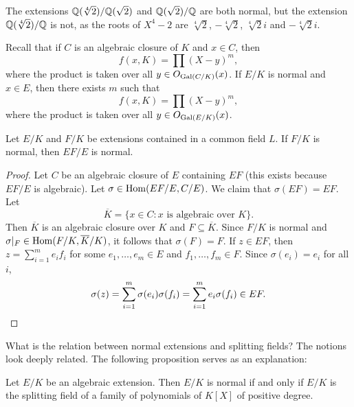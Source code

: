 \begin{example}
The extensions $\mathbb{Q}(\sqrt[4]{2})/\mathbb{Q}(\sqrt{2})$ and $\mathbb{Q}(\sqrt{2})/\mathbb{Q}$ are both
normal, but the extension $\mathbb{Q}(\sqrt[4]{2})/\mathbb{Q}$ is not, 
as the roots of $X^4-2$ are
$\sqrt[4]{2}$, $-\sqrt[4]{2}$, $\sqrt[4]{2}i$ and $-\sqrt[4]{2}i$.
\end{example}


Recall that if $C$ is an algebraic closure of $K$ and $x\in C$,
then 
\[
f(x,K)=\prod(X-y)^m,
\]
where the product is taken over all 
$y\in O_{\operatorname{Gal}(C/K)}(x)$. 
If $E/K$ is normal and $x\in E$, then there exists $m$ such that 
\[
f(x,K)=\prod(X-y)^m,
\]
where the product is taken over all 
$y\in O_{\operatorname{Gal}(E/K)}(x)$. 

\begin{proposition}
    Let $E/K$ and $F/K$ be extensions contained in a common field $L$. If $F/K$ 
    is normal, then $EF/E$ is normal.
\end{proposition}

\begin{proof}
    Let $C$ be an algebraic closure of $E$ containing $EF$ (this exists because $EF/E$ is algebraic). 
    Let $\sigma\in\operatorname{Hom}(EF/E,C/E)$. We claim that $\sigma(EF)=EF$. Let 
    \[
    \overline{K}=\{x\in C:x\text{ is algebraic over $K$}\}.
    \]
    Then $\overline{K}$ is an algebraic closure over $K$ and $F\subseteq\overline{K}$. 
    Since $F/K$ is normal and $\sigma|_F\in\operatorname{Hom}(F/K,\overline{K}/K)$, 
    it follows that $\sigma(F)=F$. If $z\in EF$, then
    $z=\sum_{i=1}^m e_if_i$ for some $e_1,\dots,e_m\in E$ and 
    $f_1,\dots,f_m\in F$. Since $\sigma(e_i)=e_i$ for all $i$,  
    \[
    \sigma(z)=\sum_{i=1}^m\sigma(e_i)\sigma(f_i)=\sum_{i=1}^m e_i\sigma(f_i)\in EF.\qedhere 
    \]
\end{proof}

What is the relation between 
normal extensions and splitting fields? The notions look
deeply related. The following proposition serves as an explanation: 

\begin{proposition}
\label{pro:normal<=>dec}
    Let $E/K$ be an algebraic extension. Then 
    $E/K$ is normal if and only if $E/K$ is the splitting field
    of a family of polynomials of $K[X]$ of positive degree.
\end{proposition}

